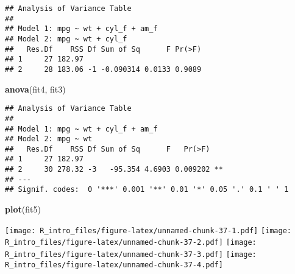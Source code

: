 \documentclass[
  a4paper,
]{article}
\newenvironment{Shaded}{\begin{snugshade}}{\end{snugshade}}
\newcommand{\FunctionTok}[1]{\textcolor[rgb]{0.13,0.29,0.53}{\textbf{#1}}}
\newcommand{\NormalTok}[1]{#1}
\begin{document}
\begin{verbatim}
## Analysis of Variance Table
## 
## Model 1: mpg ~ wt + cyl_f + am_f
## Model 2: mpg ~ wt + cyl_f
##   Res.Df    RSS Df Sum of Sq      F Pr(>F)
## 1     27 182.97                           
## 2     28 183.06 -1 -0.090314 0.0133 0.9089
\end{verbatim}

\begin{Shaded}
\begin{Highlighting}[]
\FunctionTok{anova}\NormalTok{(fit4, fit3)}
\end{Highlighting}
\end{Shaded}

\begin{verbatim}
## Analysis of Variance Table
## 
## Model 1: mpg ~ wt + cyl_f + am_f
## Model 2: mpg ~ wt
##   Res.Df    RSS Df Sum of Sq      F   Pr(>F)   
## 1     27 182.97                                
## 2     30 278.32 -3   -95.354 4.6903 0.009202 **
## ---
## Signif. codes:  0 '***' 0.001 '**' 0.01 '*' 0.05 '.' 0.1 ' ' 1
\end{verbatim}

\begin{Shaded}
\begin{Highlighting}[]
\FunctionTok{plot}\NormalTok{(fit5)}
\end{Highlighting}
\end{Shaded}

\texttt{[image: R\_intro\_files/figure-latex/unnamed-chunk-37-1.pdf]}
\texttt{[image: R\_intro\_files/figure-latex/unnamed-chunk-37-2.pdf]}
\texttt{[image: R\_intro\_files/figure-latex/unnamed-chunk-37-3.pdf]}
\texttt{[image: R\_intro\_files/figure-latex/unnamed-chunk-37-4.pdf]}
\end{document}
